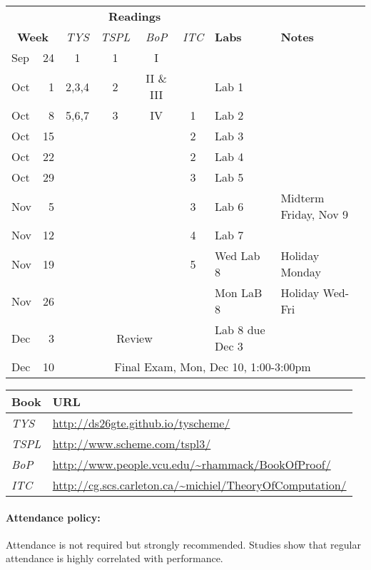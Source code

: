 \documentclass{article}
\begin{document}
  \begin{center}
\begin{tabular}{lr|cccc|l|l}                      
& & \multicolumn{4}{c|}{\bf Readings} &  \\
  \multicolumn{2}{c|}{\bf Week} &\em TYS & \em TSPL &\em BoP&\em ITC
& {\bf Labs}  & {\bf Notes} \\\hline  
Sep & 24  & 1 & 1 & I   & &  \\
Oct & 1 & 2,3,4 & 2 & II \& III &   &Lab 1 &\\
Oct & 8 & 5,6,7 & 3 & IV  & 1 & Lab 2&\\
Oct & 15 &  &   &    & 2 & Lab 3&\\
Oct & 22 &  &   &     & 2 & Lab 4&\\
Oct & 29 &  &   &     & 3 & Lab 5&\\
Nov & 5 &  &   &     & 3 & Lab 6 &Midterm Friday, Nov 9\\
Nov & 12 &  &   &     & 4 & Lab 7&\\
Nov & 19 &  &   &     & 5 & Wed Lab 8& Holiday Monday\\
Nov & 26 &  &  &      &  &Mon LaB 8& Holiday Wed-Fri \\                 
Dec & 3   &  \multicolumn{4}{c|}{Review}  &Lab 8 due Dec 3&\\ \hline
Dec & 10  &  \multicolumn{6}{|c}{Final Exam, Mon, Dec 10, 1:00-3:00pm} \\
\end{tabular}

\begin{tabular}{ll}
Book & URL\\\hline
{\em TYS} &       \url{http://ds26gte.github.io/tyscheme/} \\
{\em TSPL} & \url{http://www.scheme.com/tspl3/} \\
{\em BoP} & \url{http://www.people.vcu.edu/~rhammack/BookOfProof/}\\
{\em ITC} & \url{http://cg.scs.carleton.ca/~michiel/TheoryOfComputation/}\\
\end{tabular}

\end{center}

\paragraph{Attendance policy:} Attendance is not required but strongly
  recommended.  Studies show that regular attendance is highly
  correlated with performance.
\end{document}
